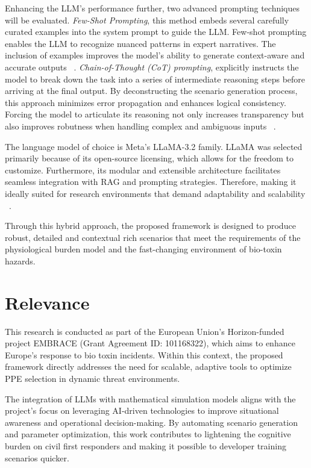 \documentclass[stu]{apa7}
\begin{document}
    Enhancing the LLM's performance further, two advanced prompting techniques will be
    evaluated.
    \textit{Few-Shot Prompting}, this method embeds several carefully curated examples
    into the system prompt to guide the LLM\@.
    Few-shot prompting enables the LLM to recognize nuanced patterns in expert narratives.
    The inclusion of examples improves the model's ability to generate context-aware
    and accurate outputs ~\cite{brown2020languagemodelsfewshotlearners}.
    \textit{Chain-of-Thought (CoT) prompting}, explicitly instructs the model to break
    down the task into a series of intermediate reasoning steps before arriving at the
    final output.
    By deconstructing the scenario generation process, this approach minimizes error
    propagation and enhances logical consistency.
    Forcing the model to articulate its reasoning not only increases transparency but
    also improves robutness when handling complex and ambiguous inputs
    ~\cite{wei2023chainofthoughtpromptingelicitsreasoning}.

    The language model of choice is Meta's LLaMA-3.2 family.
    LLaMA was selected primarily because of its open-source licensing, which allows
    for the freedom to customize.
    Furthermore, its modular and extensible architecture facilitates seamless
    integration with RAG and prompting strategies.
    Therefore, making it ideally suited for research environments that demand
    adaptability and scalability ~\cite{grattafiori2024llama3herdmodels}.

    Through this hybrid approach, the proposed framework is designed to produce robust,
    detailed and contextual rich scenarios that meet the requirements of the
    physiological burden model and the fast-changing environment of bio-toxin hazards.

    \section{Relevance}\label{sec:relevance}

    This research is conducted as part of the European Union's Horizon-funded project
    EMBRACE (Grant Agreement ID: 101168322), which aims to enhance Europe's response to
    bio toxin incidents.
    Within this context, the proposed framework directly addresses the need for scalable,
    adaptive tools to optimize PPE selection in dynamic threat environments.

    The integration of LLMs with mathematical simulation models aligns with the project's
    focus on leveraging AI-driven technologies to improve situational awareness and
    operational decision-making.
    By automating scenario generation and parameter optimization,
    this work contributes to lightening the cognitive burden on civil first responders and
    making it possible to developer training scenarios quicker.

    
\end{document}
